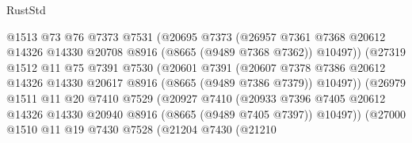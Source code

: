\begin{lexlean}{RustStd}
\begin{coremodule}
                              @1513
                              @73
                              @76
                              @7373
                              @7531
                              (@20695
                                @7373
                                (@26957
                                  @7361
                                  @7368
                                  @20612
                                  @14326
                                  @14330
                                  @20708
                                  @8916
                                  (@8665 (@9489 @7368 @7362))
                                  @10497))
                              (@27319
                                @1512
                                @11
                                @75
                                @7391
                                @7530
                                (@20601
                                  @7391
                                  (@20607
                                    @7378
                                    @7386
                                    @20612
                                    @14326
                                    @14330
                                    @20617
                                    @8916
                                    (@8665 (@9489 @7386 @7379))
                                    @10497))
                                (@26979
                                  @1511
                                  @11
                                  @20
                                  @7410
                                  @7529
                                  (@20927
                                    @7410
                                    (@20933
                                      @7396
                                      @7405
                                      @20612
                                      @14326
                                      @14330
                                      @20940
                                      @8916
                                      (@8665 (@9489 @7405 @7397))
                                      @10497))
                                  (@27000
                                    @1510
                                    @11
                                    @19
                                    @7430
                                    @7528
                                    (@21204
                                      @7430
                                      (@21210

\end{coremodule}
\end{lexlean}
